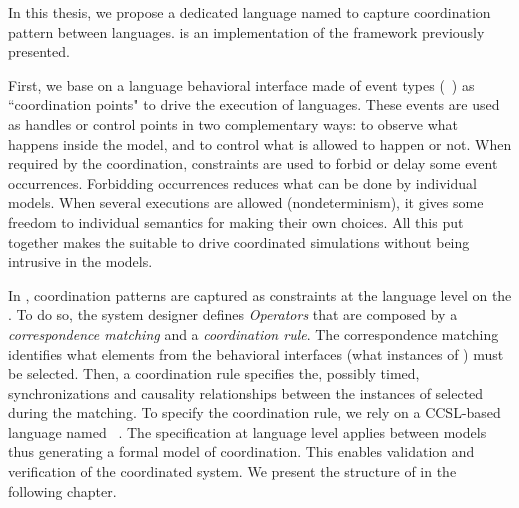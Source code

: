 In this thesis, we propose a dedicated language named \bcool to capture coordination pattern between languages. \bcool is an implementation of the framework previously presented.  

First, we base on a language behavioral interface made of event types (\ie \dse~\cite{sle13-combemale}) as ``coordination points" to drive the execution of languages. These events are used as handles or control points in two complementary ways: to observe what happens inside the model, and to control what is allowed to happen or not. When required by the coordination, constraints are used to forbid or delay some event occurrences. Forbidding occurrences reduces what can be done by individual models. When several executions are allowed
(nondeterminism), it gives some freedom to individual semantics for making their own choices. All this put together makes the \dse suitable to drive coordinated simulations without being intrusive in the models. 

In \bcool, coordination patterns are captured as constraints at the language level on the \dse. To do so, the system designer defines \emph{Operators} that are composed by a \emph{correspondence matching} and a \emph{coordination rule}. The correspondence matching identifies what elements from the behavioral interfaces (\ie what instances of \dse) must be selected. Then, a coordination rule specifies the, possibly timed, synchronizations and causality relationships between the instances of \dse selected during the matching. To specify the coordination rule, we rely on a CCSL-based language named \moccml~\cite{moccmlbib}. The specification at language level applies between models thus generating a formal model of coordination. This enables validation and verification of the coordinated system. We present the structure of \bcool in the following chapter.
